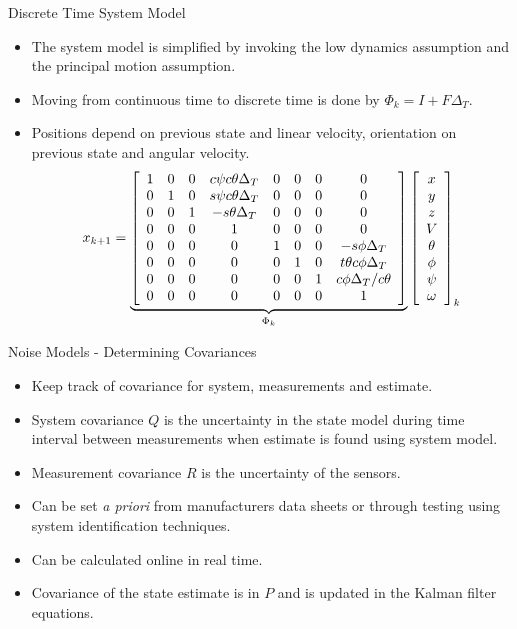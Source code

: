 \documentclass[hyperref={pdfpagelabels=false}]{beamer}
\begin{document}
\begin{frame}{Discrete Time System Model}
\begin{itemize}
\item The system model is simplified by invoking the low dynamics assumption and the principal motion assumption.
\item Moving from continuous time to discrete time is done by $\Phi_k = I + F\Delta_T$.
\item Positions depend on previous state and linear velocity, orientation on previous state and angular velocity.
\begin{align*}
x_{k+1} = 
\underbrace{\left[\begin{array}{c c c c c c c c}
1 & 0 & 0 & c\psi c\theta \Delta_T & 0 & 0 & 0 & 0 \\
0 & 1 & 0 & s\psi c\theta \Delta_T & 0 & 0 & 0 & 0\\
0 & 0 & 1 & -s\theta \Delta_T & 0 & 0 & 0 & 0\\
0 & 0 & 0 & 1 & 0 & 0 & 0 & 0 \\
0 & 0 & 0 & 0 & 1 & 0 & 0 & -s\phi \Delta_T \\
0 & 0 & 0 & 0 & 0 & 1 & 0 & t\theta c\phi \Delta_T \\
0 & 0 & 0 & 0 & 0 & 0 & 1 & c\phi \Delta_T/c\theta \\
0 & 0 & 0 & 0 & 0 & 0 & 0 & 1
\end{array}\right]}_{\Phi_k}
\left[\begin{array}{c}
x \\ y \\ z \\ V \\ \theta \\ \phi \\ \psi \\ \omega
\end{array}\right]_k
\end{align*}
\end{itemize}
\end{frame}

\begin{frame}{Noise Models - Determining Covariances}
\begin{itemize}
\item Keep track of covariance for system, measurements and estimate.
\item System covariance $Q$ is the uncertainty in the state model during time interval between measurements when estimate is found using system model.
\item Measurement covariance $R$ is the uncertainty of the sensors.
\item Can be set \textit{a priori} from manufacturers data sheets or through testing using system identification techniques.
\item Can be calculated online in real time.
\item Covariance of the state estimate is in $P$ and is updated in the Kalman filter equations.
\end{itemize}
\end{frame}
\end{document}
